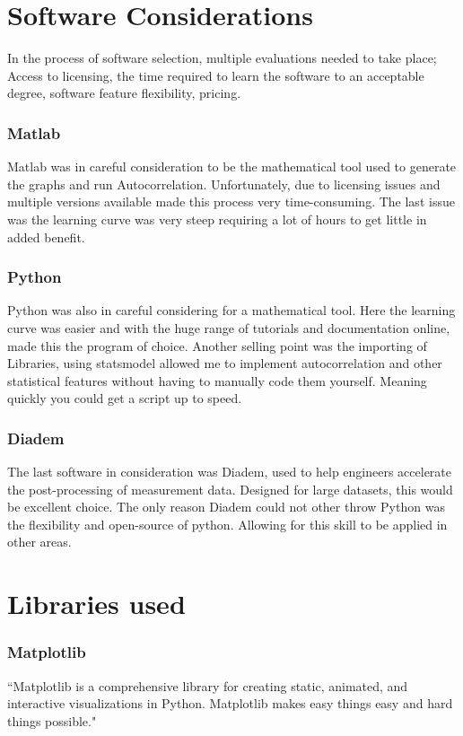 \section{Software Considerations}

\raggedright
In the process of software selection, multiple evaluations needed to take place; Access to licensing, the time required to learn the software to an acceptable degree, software feature flexibility, pricing. 

\subsubsection{Matlab}

Matlab was in careful consideration to be the mathematical tool used to generate the graphs and run Autocorrelation. Unfortunately, due to licensing issues and multiple versions available made this process very time-consuming. The last issue was the learning curve was very steep requiring a lot of hours to get little in added benefit.

\subsubsection{Python}

Python was also in careful considering for a mathematical tool. Here the learning curve was easier and with the huge range of tutorials and documentation online, made this the program of choice. Another selling point was the importing of Libraries, using statsmodel allowed me to implement autocorrelation and other statistical features without having to manually code them yourself. Meaning quickly you could get a script up to speed.

\subsubsection{Diadem}

The last software in consideration was Diadem, used to help engineers accelerate the post-processing of measurement data. Designed for large datasets, this would be excellent choice. The only reason Diadem could not other throw Python was the flexibility and open-source of python. Allowing for this skill to be applied in other areas. 

\section{Libraries used}
\subsubsection{Matplotlib}
``Matplotlib is a comprehensive library for creating static, animated, and interactive visualizations in Python. Matplotlib makes easy things easy and hard things possible." \cite{matplotlib}

